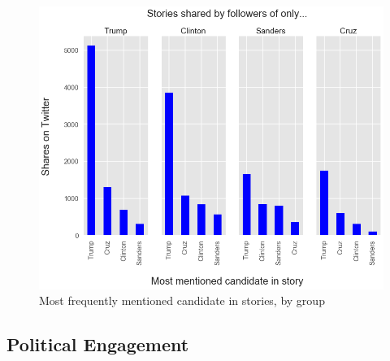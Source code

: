 \documentclass[letterpaper]{article}
\begin{document}

\begin{figure}[htbp!] 
\centering 
 \includegraphics[width=1.0\columnwidth]{who-shares-stories-about}  
  \caption{Most frequently mentioned candidate in stories, by group
    \label{fig:who-shares-stories-about}}
\end{figure}
 
\subsection{Political Engagement}

\end{document}
